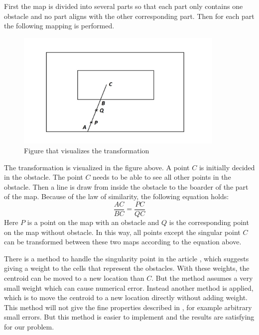 \documentclass[ebook,11pt] {kth-mag}
\begin{document}
First the map is divided into several parts so that each part only contains one obstacle and no part aligns with the other corresponding part. Then for each part the following mapping is performed. 

\begin{figure}[h]
\includegraphics[width=10cm]{transform.jpg}
\centering
\caption{Figure that visualizes the transformation}
\end{figure}

The transformation is visualized in the figure above. A point $C$ is initially decided in the obstacle. The point $C$ needs to be able to see all other points in the obstacle. Then a line is draw from inside the obstacle to the boarder of the part of the map. Because of the law of similarity, the following equation holds:
$$
\frac{AC}{BC} = \frac{PC}{QC}
$$
Here $P$ is a point on the map with an obstacle and $Q$ is the corresponding point on the map without obstacle. In this way, all points except the singular point $C$ can be transformed between these two maps according to the equation above. 

There is a method to handle the singularity point in the article \cite{noncov}, which suggests giving a weight to the cells that represent the obstacles. With these weights, the centroid can be moved to a new location than $C$. But the method assumes a very small weight which can cause numerical error. Instead another method is applied, which is to move the centroid to a new location directly without adding weight. This method will not give the fine properties described in \cite{noncov}, for example arbitrary small errors. But this method is easier to implement and the results are satisfying for our problem. 
\end{document}
